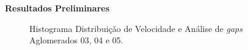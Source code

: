 \documentclass[xcolor=dvipsnames,10pt]{beamer}
\begin{document}
\begin{frame}{\textbf{Resultados Preliminares}}
\begin{figure}[!htbp]
    \caption{Histograma Distribuição de Velocidade e Análise de \textit{gaps} Aglomerados 03, 04 e 05.}
  \end{figure}
\end{frame}
\end{document}
